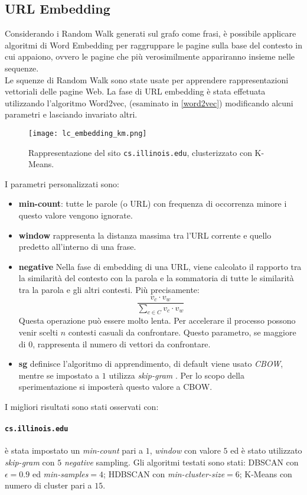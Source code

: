 \subsection{URL Embedding}
Considerando i Random Walk generati sul grafo come frasi, è possibile applicare algoritmi di Word Embedding per raggruppare le pagine sulla base del contesto in cui appaiono, ovvero le pagine che più verosimilmente appariranno insieme nelle sequenze.
\\
Le squenze di Random Walk sono state usate per apprendere rappresentazioni vettoriali delle pagine Web. La fase di URL embedding è stata effetuata utilizzando l'algoritmo Word2vec, \cite{gensim} (esaminato in \ref{word2vec}) modificando alcuni parametri e lasciando invariato altri.
\\
\begin{figure}[h!]
	\centering
	\texttt{[image: lc\_embedding\_km.png]}
	\caption{Rappresentazione del sito \texttt{cs.illinois.edu}, clusterizzato con K-Means.}
	\label{nc_embedding_km}
\end{figure}
I parametri personalizzati sono:
\begin{itemize}
\item \textbf{min-count}: tutte le parole (o URL) con frequenza di occorrenza minore i questo valore vengono ignorate.
\item \textbf{window} rappresenta la distanza massima tra l'URL corrente e quello predetto all'interno di una frase.
\item \textbf{negative} Nella fase di embedding di una URL, viene calcolato il rapporto tra la similarità del contesto con la parola e la sommatoria di tutte le similarità tra la parola e gli altri contesti. Più precisamente:
\begin{equation}
\frac{v_c \cdot v_w}{\sum\limits_{c \in C} v_c \cdot v_w}
\end{equation}
Questa operazione può essere molto lenta. Per accelerare il processo possono venir scelti $n$ contesti casuali da confrontare. Questo parametro, se maggiore di $0$, rappresenta il numero di vettori da confrontare.
\item \textbf{sg} definisce l'algoritmo di apprendimento, di default viene usato \textit{CBOW}, mentre se impostato a $1$ utilizza \textit{skip-gram} \cite{Mikolov13}. Per lo scopo della sperimentazione si imposterà questo valore a  CBOW.
\end{itemize}
I migliori risultati sono stati osservati con:

\paragraph{\texttt{cs.illinois.edu}} è stata impostato un \textit{min-count} pari a $1$, \textit{window} con valore $5$ ed è stato utilizzato \textit{skip-gram} con $5$ \textit{negative} sampling. Gli algoritmi testati sono stati: DBSCAN con $\epsilon = 0.9$ ed \textit{min-samples}$ = 4$; HDBSCAN con \textit{min-cluster-size}$=6$; K-Means con numero di cluster pari a $15$. 

